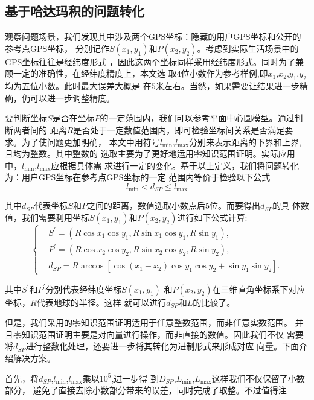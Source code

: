 \documentclass[zihao=-4]{ctexart}
\begin{document}
\begin{spacing}{1.5}
\subsection{基于哈达玛积的问题转化}
观察问题场景，我们发现其中涉及两个GPS坐标：隐藏的用户GPS坐标和公开的参考点GPS坐标，
分别记作$S(x_1,y_1)$和$P(x_2,y_2)$。考虑到实际生活场景中的GPS坐标往往是经纬度形式
，因此这两个坐标同样采用经纬度形式。同时为了兼顾一定的准确性，在经纬度精度上，本文选
取4位小数作为参考样例,即$x_1$,$x_2$,$y_1$,$y_2$均为五位小数。此时最大误差大概是
在$5$米左右。当然，如果需要让结果进一步精确，仍可以进一步调整精度。\par
要判断坐标$S$是否在坐标$P$的一定范围内，我们可以参考平面中心圆模型。通过判断两者间的
距离$R$是否处于一定数值范围内，即可检验坐标间关系是否满足要求。为了使问题更加明确，
本文中用符号$l_{\min}$,$l_{\max}$分别来表示距离的下界和上界,且均为整数。其中整数的
选取主要为了更好地运用零知识范围证明。实际应用中，$l_{\min}$,$l_{\max}$应根据具体需
求进行一定的变化。基于以上定义，我们将问题转化为：用户GPS坐标在参考点GPS坐标的一定
范围内等价于检验以下公式
\begin{equation}l_{\min}< d_{SP}\leq l_{\max}\end{equation}\par
其中$d_{SP}$代表坐标$S$和$P$之间的距离，数值选取小数点后5位。而要得出$d_{SP}$的具
体数值，我们需要利用坐标$S(x_1,y_1)$和$P(x_2,y_2)$进行如下公式计算:
\begin{equation}
  \begin{cases}
    &S^{\prime}=(R\cos x_1\cos y_1,R\sin x_1\cos y_1,R\sin y_1),\\
    &P^{\prime}=(R\cos x_2\cos y_2,R\sin x_2\cos y_2,R\sin y_2),\\
    &d_{SP}=R\arccos[\cos(x_1-x_2)\cos y_1\cos y_2+\sin y_1\sin y_2].
  \end{cases}
\end{equation}\par
其中$S^{\prime}$和$P^{\prime}$分别代表经纬度坐标$S(x_1,y_1)$
和$P(x_2,y_2)$在三维直角坐标系下对应坐标，$R$代表地球的半径。这样
就可以进行$d_{SP}$和$L$的比较了。\par
但是，我们采用的零知识范围证明适用于任意整数范围，而非任意实数范围。
并且零知识范围证明主要是对向量进行操作，而非直接的数值。因此我们不仅
需要将$d_{SP}$进行整数化处理，还要进一步将其转化为进制形式来形成对应
向量。下面介绍解决方案。\par
首先，将$d_{SP}$,$l_{\min}$,$l_{\max}$乘以$10^5$,进一步得
到$D_{SP}$,$L_{\min}$,$L_{\max}$这样我们不仅保留了小数部分，
避免了直接去除小数部分带来的误差，同时完成了取整。不过值得注

\end{spacing}
\end{document}
